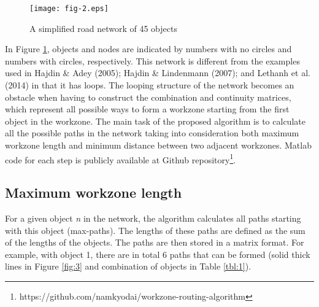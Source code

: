 \documentclass[10pt]{article}
\begin{document}
\begin{figure}[h]
\begin{center}
\texttt{[image: fig-2.eps]}
\caption{A simplified road network of 45 objects}\label{fig:2}
\end{center}
\end{figure}

In Figure \ref{fig:2}, objects and nodes are indicated by numbers with no
circles and numbers with circles, respectively. This network is different from
the examples used in Hajdin \& Adey (2005); Hajdin \& Lindenmann (2007); and
Lethanh et al. (2014) in that it has loops. The looping structure of the network
becomes an obstacle when having to construct the combination and continuity
matrices, which represent all possible ways to form a workzone starting from the
first object in the workzone. The main task of the proposed algorithm is to
calculate all the possible paths in the network taking into consideration both
maximum workzone length and minimum distance between two adjacent workzones.
Matlab code for each step is publicly available at Github
repository\footnote{https://github.com/namkyodai/workzone-routing-algorithm}.

\subsection{Maximum workzone length}

For a given object \textit{n }in the network, the algorithm calculates all paths
starting with this object (max-paths). The lengths of these paths are defined as
the sum of the lengths of the objects. The paths are then stored in a matrix
format. For example, with object 1, there are in total 6 paths that can be formed
(solid thick lines in Figure \ref{fig:3} and combination of objects in Table
\ref{tbl:1}).
\end{document}

